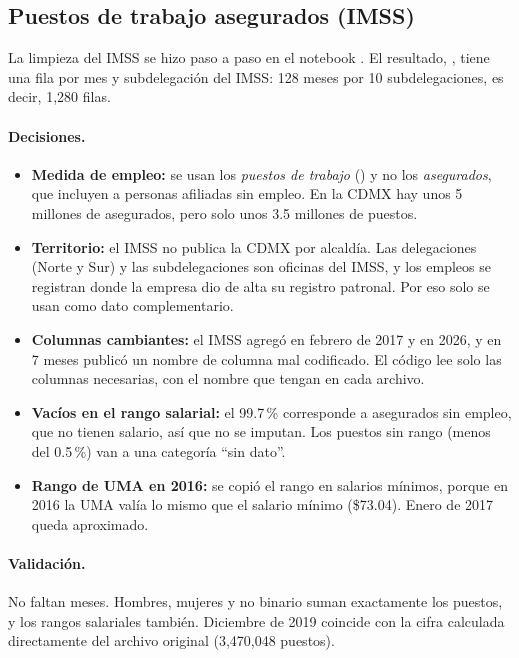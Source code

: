 \subsection{Puestos de trabajo asegurados (IMSS)}
La limpieza del IMSS se hizo paso a paso en el notebook . El
resultado, , tiene una fila por mes y subdelegación del IMSS:
128 meses por 10 subdelegaciones, es decir, 1,280 filas.

\paragraph{Decisiones.}
\begin{itemize}
  \item \textbf{Medida de empleo:} se usan los \emph{puestos de trabajo} () y no los
        \emph{asegurados}, que incluyen a personas afiliadas sin empleo. En la CDMX hay unos 5
        millones de asegurados, pero solo unos 3.5 millones de puestos.
  \item \textbf{Territorio:} el IMSS no publica la CDMX por alcaldía. Las delegaciones (Norte y Sur)
        y las subdelegaciones son oficinas del IMSS, y los empleos se registran donde la empresa dio
        de alta su registro patronal. Por eso solo se usan como dato complementario.
  \item \textbf{Columnas cambiantes:} el IMSS agregó  en febrero de 2017 y
         en 2026, y en 7 meses publicó un nombre de columna mal codificado. El código
        lee solo las columnas necesarias, con el nombre que tengan en cada archivo.
  \item \textbf{Vacíos en el rango salarial:} el 99.7\,\% corresponde a asegurados sin empleo, que no
        tienen salario, así que no se imputan. Los puestos sin rango (menos del 0.5\,\%) van a una
        categoría \enquote{sin dato}.
  \item \textbf{Rango de UMA en 2016:} se copió el rango en salarios mínimos, porque en 2016 la UMA
        valía lo mismo que el salario mínimo (\$73.04). Enero de 2017 queda aproximado.
\end{itemize}

\paragraph{Validación.} No faltan meses. Hombres, mujeres y no binario suman exactamente los
puestos, y los rangos salariales también. Diciembre de 2019 coincide con la cifra calculada
directamente del archivo original (3,470,048 puestos).

